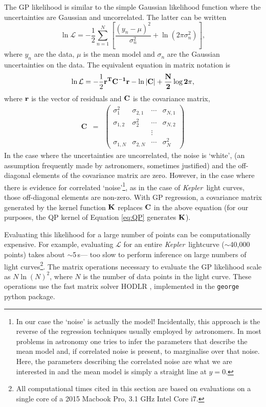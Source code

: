 \documentclass[a4paper,fleqn,usenatbib,useAMS]{mnras}
\newcommand{\Kepler}{{\it Kepler}}
\begin{document}
The GP likelihood is similar to the simple Gaussian likelihood
function where the uncertainties are
Gaussian and uncorrelated. The latter can be written
\begin{equation}
    \ln \mathcal{L} = -\frac{1}{2}\sum_{n=1}^N\left[\frac{(y_n-\mu)^2}{\sigma_n^2}
    + \ln(2\pi\sigma_n^2)\right],
\end{equation}
\label{eq:chi2}
where $y_n$ are the data, $\mu$ is the mean model and $\sigma_n$ are the
Gaussian uncertainties on the data.
The equivalent equation in matrix notation is
\begin{equation}
\ln \mathcal{L} = -\frac{1}{2}\bf{r}^T\bf{C}^{-1}\bf{r}-\ln|\bf{C}|
    + \frac{N}{2}\log2\pi,
\end{equation}
\label{eq:lhf1}
where $\bf{r}$ is the vector of residuals and $\bf{C}$ is the covariance
matrix,
\begin{eqnarray}
    \mathbf{C} &=& \left (\begin{array}{cccc}
    \sigma^2_1 & \sigma_{2, 1} & \cdots & \sigma_{N, 1} \\
    \sigma_{1, 2} & \sigma^2_2 & \cdots & \sigma_{N, 2} \\
    && \vdots & \\
    \sigma_{1, N} & \sigma_{2, N} & \cdots & \sigma^2_N
\end{array}\right )
\end{eqnarray}
In the case where the uncertainties are uncorrelated, the noise is `white',
(an assumption frequently made by astronomers, sometimes justified)
and the off-diagonal elements of the covariance matrix are zero.
However, in the case where there is evidence for correlated
`noise'\footnote{In our case the `noise' is actually the model!  Incidentally, this approach is the reverse of the regression techniques
usually employed by astronomers.
In most problems in astronomy one tries to infer the parameters that describe
the mean model and, if correlated noise is present, to marginalise over that
noise.
Here, the parameters describing the correlated noise are what we are
interested in and the mean model is simply a straight line at $y=0$.}, as in the
case of \Kepler\ light curves, those off-diagonal elements are non-zero.
With GP regression, a covariance matrix generated by the kernel function
${\bf K}$ replaces ${\bf C}$ in the above equation (for our purposes, the QP
kernel of Equation \ref{eq:QP} generates ${\bf K}$).

Evaluating this likelihood for a large number of points can be computationally
expensive.
For example, evaluating $\mathcal L$ for an entire \Kepler\ lightcurve
($\sim$40,000 points) takes about $\sim$5\,s--- too slow to perform inference
on large numbers of light curves\footnote{All computational times cited in
this section are based on evaluations on a single core of a 2015 Macbook Pro,
3.1 GHz Intel Core i7.}.
The matrix operations necessary to evaluate the GP likelihood scale as
$N\ln(N)^2$, where $N$ is the number of data points in the light curve.
These operations use the fast matrix solver HODLR \citep{Ambikasaran2014},
implemented in the {\tt george} \citep{George} python package.
\end{document}
